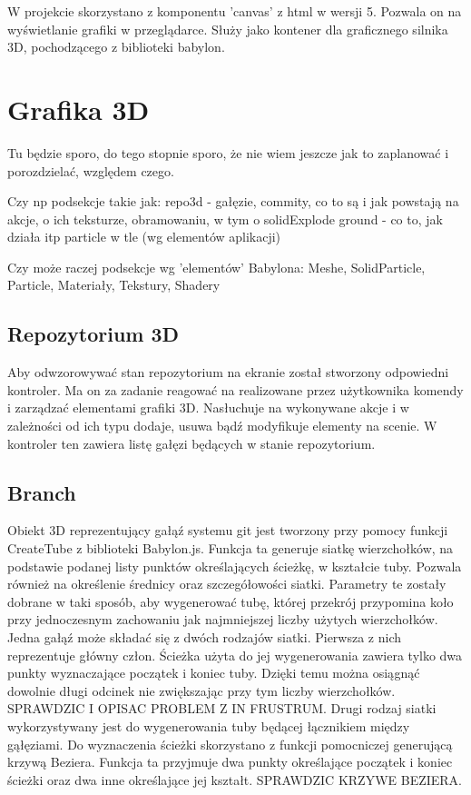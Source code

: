 \documentclass[11pt,a4paper,polish,thesis]{dcsbook}
\begin{document}
	W projekcie skorzystano z komponentu 'canvas' z html w wersji 5. Pozwala on na wyświetlanie grafiki w przeglądarce. Służy jako kontener dla graficznego silnika 3D, pochodzącego z biblioteki babylon. 
	
	\section{Grafika 3D}
	Tu będzie sporo, do tego stopnie sporo, że nie wiem jeszcze jak to zaplanować i porozdzielać, względem czego.
	
	Czy np podsekcje takie jak:
	repo3d - gałęzie, commity, co to są i jak powstają na akcje, o ich teksturze, obramowaniu, w tym o solidExplode
	ground - co to, jak działa itp
	particle w tle
	(wg elementów aplikacji)
	
	Czy może raczej podsekcje wg 'elementów' Babylona:
	Meshe, SolidParticle, Particle, Materiały, Tekstury, Shadery
	
	

	\subsection{Repozytorium 3D}
		Aby odwzorowywać stan repozytorium na ekranie został stworzony odpowiedni kontroler. Ma on za zadanie reagować na realizowane przez użytkownika komendy i zarządzać elementami grafiki 3D. Nasłuchuje na wykonywane akcje i w zależności od ich typu dodaje, usuwa bądź modyfikuje elementy na scenie. W kontroler ten zawiera listę gałęzi będących w stanie repozytorium. %

	\subsection{Branch}
	Obiekt 3D reprezentujący gałąź systemu git jest tworzony przy pomocy funkcji CreateTube z biblioteki Babylon.js. 
Funkcja ta generuje siatkę wierzchołków, na podstawie podanej listy punktów określających ścieżkę, w kształcie tuby. Pozwala również na określenie średnicy oraz
szczegółowości siatki. Parametry te zostały dobrane w taki sposób, aby wygenerować tubę, której przekrój przypomina koło przy jednoczesnym zachowaniu jak najmniejszej liczby użytych wierzchołków. Jedna gałąź może składać się z dwóch rodzajów siatki. Pierwsza z nich reprezentuje główny człon. Ścieżka użyta do jej wygenerowania zawiera tylko dwa punkty wyznaczające początek i koniec tuby. Dzięki temu można osiągnąć dowolnie długi odcinek nie zwiększając przy tym liczby wierzchołków. SPRAWDZIC I OPISAC PROBLEM Z IN FRUSTRUM. Drugi rodzaj siatki wykorzystywany jest do wygenerowania tuby będącej łącznikiem między gąłęziami. Do wyznaczenia ścieżki skorzystano z funkcji pomocniczej generującą krzywą Beziera. Funkcja ta przyjmuje dwa punkty określające początek i koniec ścieżki oraz dwa inne określające jej kształt. SPRAWDZIC KRZYWE BEZIERA. 
\end{document}
